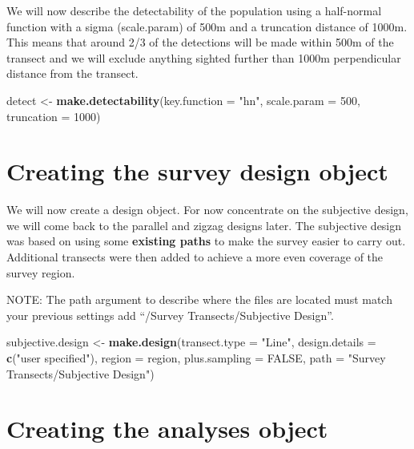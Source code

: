 \documentclass[]{book}
\newenvironment{Shaded}{\begin{snugshade}}{\end{snugshade}}
\newcommand{\KeywordTok}[1]{\textcolor[rgb]{0.13,0.29,0.53}{\textbf{#1}}}
\newcommand{\DataTypeTok}[1]{\textcolor[rgb]{0.13,0.29,0.53}{#1}}
\newcommand{\DecValTok}[1]{\textcolor[rgb]{0.00,0.00,0.81}{#1}}
\newcommand{\StringTok}[1]{\textcolor[rgb]{0.31,0.60,0.02}{#1}}
\newcommand{\OtherTok}[1]{\textcolor[rgb]{0.56,0.35,0.01}{#1}}
\newcommand{\NormalTok}[1]{#1}
\theoremstyle{definition}
\theoremstyle{definition}
\theoremstyle{remark}
\begin{document}
We will now describe the detectability of the population using a
half-normal function with a sigma (scale.param) of 500m and a truncation
distance of 1000m. This means that around 2/3 of the detections will be
made within 500m of the transect and we will exclude anything sighted
further than 1000m perpendicular distance from the transect.

\begin{Shaded}
\begin{Highlighting}[]
\NormalTok{detect <-}\StringTok{ }\KeywordTok{make.detectability}\NormalTok{(}\DataTypeTok{key.function =} \StringTok{"hn"}\NormalTok{, }\DataTypeTok{scale.param =} \DecValTok{500}\NormalTok{, }\DataTypeTok{truncation =} \DecValTok{1000}\NormalTok{)}
\end{Highlighting}
\end{Shaded}

\section{Creating the survey design
object}\label{creating-the-survey-design-object}

We will now create a design object. For now concentrate on the
subjective design, we will come back to the parallel and zigzag designs
later. The subjective design was based on using some \textbf{existing
paths} to make the survey easier to carry out. Additional transects were
then added to achieve a more even coverage of the survey region.

NOTE: The path argument to describe where the files are located must
match your previous settings add ``/Survey Transects/Subjective
Design''.

\begin{Shaded}
\begin{Highlighting}[]
\NormalTok{subjective.design <-}\StringTok{ }\KeywordTok{make.design}\NormalTok{(}\DataTypeTok{transect.type =} \StringTok{"Line"}\NormalTok{, }
                                 \DataTypeTok{design.details =} \KeywordTok{c}\NormalTok{(}\StringTok{"user specified"}\NormalTok{), }
                                 \DataTypeTok{region =}\NormalTok{ region, }
                                 \DataTypeTok{plus.sampling =} \OtherTok{FALSE}\NormalTok{, }
                                 \DataTypeTok{path =} \StringTok{"Survey Transects/Subjective Design"}\NormalTok{)}
\end{Highlighting}
\end{Shaded}

\section{Creating the analyses
object}\label{creating-the-analyses-object}
\end{document}
